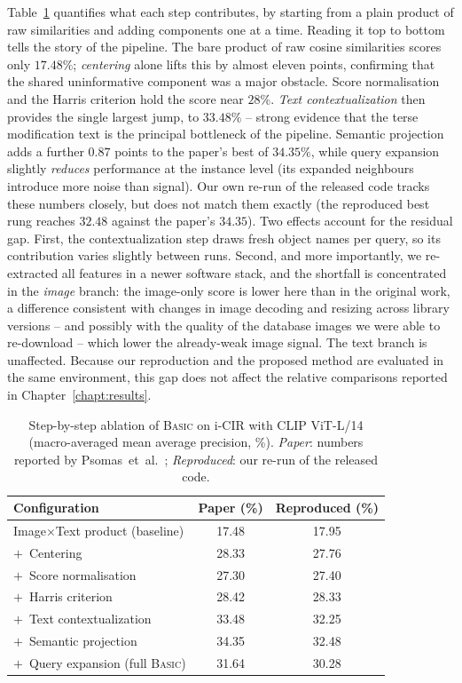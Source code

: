 Table~\ref{tab:basic_ablation} quantifies what each step contributes, by starting
from a plain product of raw similarities and adding components one at a time.
Reading it top to bottom tells the story of the pipeline. The bare product of raw
cosine similarities scores only $17.48\%$; \emph{centering} alone lifts this by
almost eleven points, confirming that the shared uninformative component was a
major obstacle. Score normalisation and the Harris criterion hold the score near
$28\%$. \emph{Text contextualization} then provides the single largest jump, to
$33.48\%$ -- strong evidence that the terse modification text is the principal
bottleneck of the pipeline. Semantic projection adds a further $0.87$ points to
the paper's best of $34.35\%$, while query expansion slightly \emph{reduces}
performance at the instance level (its expanded neighbours introduce more noise
than signal). Our own re-run of the released code tracks these numbers closely, but does not
match them exactly (the reproduced best rung reaches $32.48$ against the paper's
$34.35$). Two effects account for the residual gap. First, the contextualization
step draws fresh object names per query, so its contribution varies slightly
between runs. Second, and more importantly, we re-extracted all features in a
newer software stack, and the shortfall is concentrated in the \emph{image}
branch: the image-only score is lower here than in the original work, a
difference consistent with changes in image decoding and resizing across library
versions -- and possibly with the quality of the database images we were able to
re-download -- which lower the already-weak image signal. The text branch is
unaffected. Because our reproduction and the proposed method are evaluated in the
same environment, this gap does not affect the relative comparisons reported in
Chapter~\ref{chapt:results}.

\begin{table}[htbp]
  \centering
  \caption{%
    Step-by-step ablation of \textsc{Basic} on i-CIR with CLIP ViT-L/14
    (macro-averaged mean average precision, \%).
    \emph{Paper}: numbers reported by Psomas~et~al.~\cite{psomas2025icir};
    \emph{Reproduced}: our re-run of the released code.%
  }
  \label{tab:basic_ablation}
  \begin{tabular}{lcc}
    \toprule
    Configuration & Paper (\%) & Reproduced (\%) \\
    \midrule
    Image$\times$Text product (baseline)      & 17.48 & 17.95 \\
    $+$~Centering                             & 28.33 & 27.76 \\
    $+$~Score normalisation                   & 27.30 & 27.40 \\
    $+$~Harris criterion                      & 28.42 & 28.33 \\
    $+$~Text contextualization                & 33.48 & 32.25 \\
    $+$~Semantic projection                   & 34.35 & 32.48 \\
    $+$~Query expansion (full \textsc{Basic})  & 31.64 & 30.28 \\
    \bottomrule
  \end{tabular}
\end{table}

